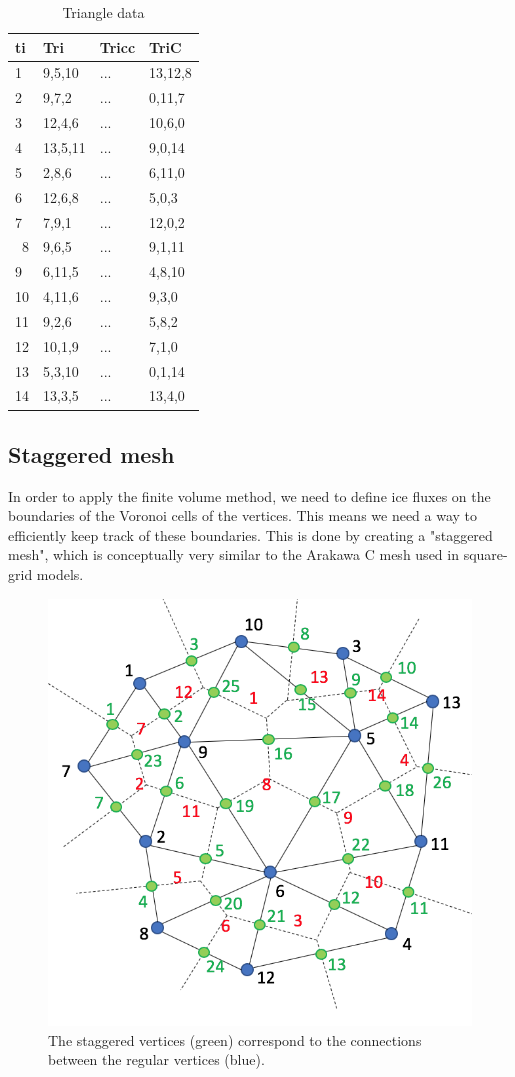 \documentclass{article}
\begin{document}
\begin{table}[H] \label{tab:table_triangledata_01}
  \begin{center}
    \caption{Triangle data}
    \begin{tabular}{l|l|l|l}
      \textbf{ti} & \textbf{Tri} & \textbf{Tricc} & \textbf{TriC}\\
      \hline
      1 & 9,5,10 & ... & 13,12,8\\
      2 & 9,7,2 & ... & 0,11,7\\
      3 & 12,4,6 & ... & 10,6,0\\
      4 & 13,5,11 & ... & 9,0,14\\
      5 & 2,8,6 & ... & 6,11,0\\
      6 & 12,6,8 & ... & 5,0,3\\
      7 & 7,9,1 & ... & 12,0,2\\\
      8 & 9,6,5 & ... & 9,1,11\\
      9 & 6,11,5 & ... & 4,8,10\\
      10 & 4,11,6 & ... & 9,3,0\\
      11 & 9,2,6 & ... & 5,8,2\\
      12 & 10,1,9 & ... & 7,1,0\\
      13 & 5,3,10 & ... & 0,1,14\\
      14 & 13,3,5 & ... & 13,4,0\\
    \end{tabular}
  \end{center}
\end{table}


\subsection{Staggered mesh}

In order to apply the finite volume method, we need to define ice fluxes on the boundaries of the Voronoi cells of the vertices. This means we need a way to efficiently keep track of these boundaries. This is done by creating a "staggered mesh", which is conceptually very similar to the Arakawa C mesh used in square-grid models.

\begin{figure}[H] \label{fig:staggeredmesh}
  \includegraphics[width=0.5\linewidth]{Fig_staggeredmesh.png}
  \caption{The staggered vertices (green) correspond to the connections between the regular vertices (blue).}
\end{figure}
\end{document}
